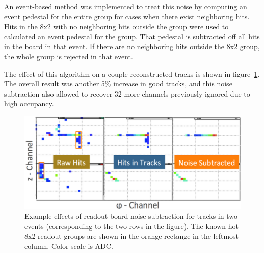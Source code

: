 An event-based method was implemented to treat this noise by computing an event 
pedestal for the entire group for cases when there exist neighboring hits.
Hits in the 8x2 with no neighboring hits outside the group were used to 
calculated an event pedestal for the group. That pedestal is subtracted off all 
hits in the board in that event. If there are no neighboring hits outside the 
8x2 group, the whole group is rejected in that event. 

The effect of this algorithm on a couple reconstructed tracks is shown in 
figure~\ref{fig:HotBoardSubtract}.  The overall result was another 5\% increase 
in good tracks, and this noise subtraction also allowed to recover 32 more 
channels previously ignored due to high occupancy.


\begin{figure}[htbp]\centering
  \includegraphics[width=13cm]{fig_rtpc/HotBoardSubtract.png}
  \caption{Example effects of readout board noise subtraction for tracks in two events (corresponding to the two rows in the figure).  The known hot 8x2 readout groups are shown in the orange rectange in the leftmost column.  Color scale is ADC.\label{fig:HotBoardSubtract}}
\end{figure}

